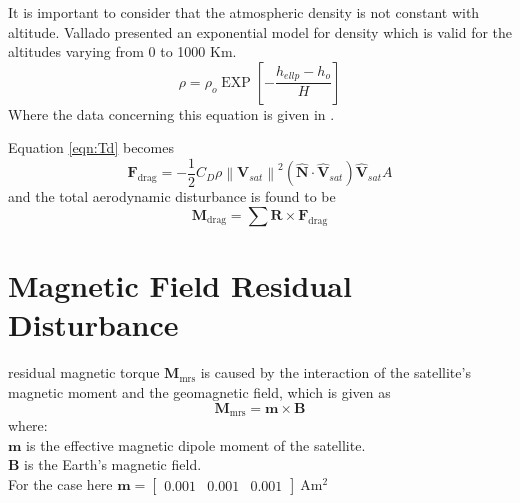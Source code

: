 It is important to consider that the atmospheric density is not constant with altitude. Vallado \cite{vallado2001fundamentals} presented an exponential model for density which is valid for the altitudes varying from 0 to 1000 Km. 
\begin{equation}
\rho=\rho_{o} \operatorname{EXP}\left[-\frac{h_{e l l p}-h_{o}}{H}\right]
\end{equation}
Where the data concerning this equation is given in \cite{vallado2001fundamentals}.

\noindent Equation \ref{eqn:Td} becomes
\begin{equation}
\mathbf{F}_{\text{drag}}=-\frac{1}{2} C_{D} \rho \left\|\mathbf{V}_{s a t}\right\|^{2}\left(\hat{\mathbf{N}} \cdot \hat{\mathbf{V}}_{s a t}\right) \hat{\mathbf{V}}_{s a t} A
\end{equation}
and the total aerodynamic disturbance is found to be
\begin{equation}
    \mathbf{M}_{\text{drag}} = \sum \mathbf{R} \times \mathbf{F}_{\text{drag}}
\end{equation}

\section{Magnetic Field Residual Disturbance}
residual magnetic torque $\mathbf{M}_{\text{mrs}}$ is caused by the interaction of the satellite's magnetic moment and the geomagnetic field, which is given as \cite{hughes2012spacecraft}
\begin{equation}
    \mathbf{M}_{\text{mrs}} = \mathbf{m} \times \mathbf{B}
\end{equation}
where:\\
$\mathbf{m}$ is the effective magnetic dipole moment of the satellite. \\
$\mathbf{B}$ is the Earth’s magnetic field. \\
\noindent For the case here $\mathbf{m} = \begin{bmatrix}
0.001 & 0.001 & 0.001
\end{bmatrix} \mathrm{~Am^2}$
\clearpage